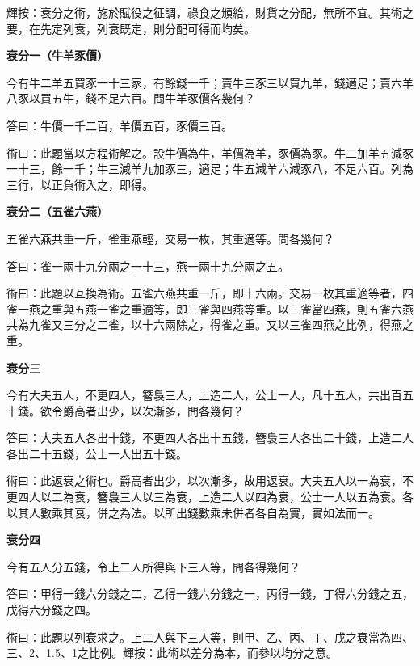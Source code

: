 \documentclass[11pt,a4paper]{article}
\newenvironment{problemenv}[1]{%
  \medskip\noindent\textbf{#1}\par\nopagebreak\smallskip
}{\medskip}
\begin{document}
輝按：衰分之術，施於賦役之征調，祿食之頒給，財貨之分配，無所不宜。其術之要，在先定列衰，列衰既定，則分配可得而均矣。

\begin{problemenv}{衰分一（牛羊豕價）}
今有牛二羊五買豕一十三家，有餘錢一千；賣牛三豕三以買九羊，錢適足；賣六羊八豕以買五牛，錢不足六百。問牛羊豕價各幾何？

\textsf{答曰：}牛價一千二百，羊價五百，豕價三百。

\textsf{術曰：}此題當以方程術解之。設牛價為牛，羊價為羊，豕價為豕。牛二加羊五減豕一十三，餘一千；牛三減羊九加豕三，適足；牛五減羊六減豕八，不足六百。列為三行，以正負術入之，即得。
\end{problemenv}

\begin{problemenv}{衰分二（五雀六燕）}
五雀六燕共重一斤，雀重燕輕，交易一枚，其重適等。問各幾何？

\textsf{答曰：}雀一兩十九分兩之一十三，燕一兩十九分兩之五。

\textsf{術曰：}此題以互換為術。五雀六燕共重一斤，即十六兩。交易一枚其重適等者，四雀一燕之重與五燕一雀之重適等，即三雀與四燕等重。以三雀當四燕，則五雀六燕共為九雀又三分之二雀，以十六兩除之，得雀之重。又以三雀四燕之比例，得燕之重。
\end{problemenv}

\begin{problemenv}{衰分三}
今有大夫五人，不更四人，簪裊三人，上造二人，公士一人，凡十五人，共出百五十錢。欲令爵高者出少，以次漸多，問各幾何？

\textsf{答曰：}大夫五人各出十錢，不更四人各出十五錢，簪裊三人各出二十錢，上造二人各出二十五錢，公士一人出五十錢。

\textsf{術曰：}此返衰之術也。爵高者出少，以次漸多，故用返衰。大夫五人以一為衰，不更四人以二為衰，簪裊三人以三為衰，上造二人以四為衰，公士一人以五為衰。各以其人數乘其衰，併之為法。以所出錢數乘未併者各自為實，實如法而一。
\end{problemenv}

\begin{problemenv}{衰分四}
今有五人分五錢，令上二人所得與下三人等，問各得幾何？

\textsf{答曰：}甲得一錢六分錢之二，乙得一錢六分錢之一，丙得一錢，丁得六分錢之五，戊得六分錢之四。

\textsf{術曰：}此題以列衰求之。上二人與下三人等，則甲、乙、丙、丁、戊之衰當為四、三、2、1.5、1之比例。輝按：此術以差分為本，而參以均分之意。
\end{problemenv}
\end{document}
